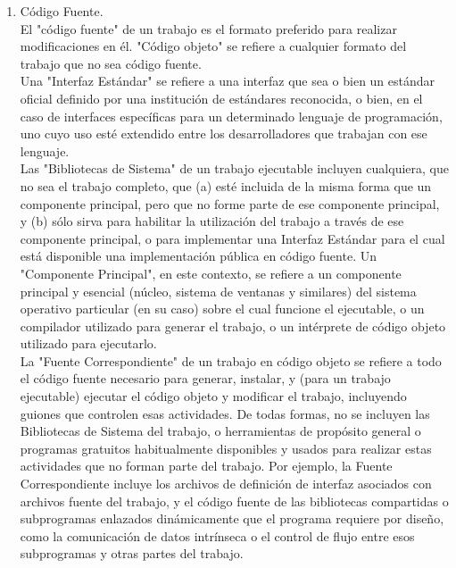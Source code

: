 \begin{enumerate}
	
	\item Código Fuente.\\
	
	El "código fuente" de un trabajo es el formato preferido para realizar modificaciones en él. "Código objeto" se refiere a cualquier formato del trabajo que no sea código fuente.\\
	
	Una "Interfaz Estándar" se refiere a una interfaz que sea o bien un estándar oficial definido por una institución de estándares reconocida, o bien, en el caso de interfaces específicas para un determinado lenguaje de programación, uno cuyo uso esté extendido entre los desarrolladores que trabajan con ese lenguaje.\\
	
	Las "Bibliotecas de Sistema" de un trabajo ejecutable incluyen cualquiera, que no sea el trabajo completo, que (a) esté incluida de la misma forma que un componente principal, pero que no forme parte de ese componente principal, y (b) sólo sirva para habilitar la utilización del trabajo a través de ese componente principal, o para implementar una Interfaz Estándar para el cual está disponible una implementación pública en código fuente. Un "Componente Principal", en este contexto, se refiere a un componente principal y esencial (núcleo, sistema de ventanas y similares) del sistema operativo particular (en su caso) sobre el cual funcione el ejecutable, o un compilador utilizado para generar el trabajo, o un intérprete de código objeto utilizado para ejecutarlo.\\
	
	La "Fuente Correspondiente" de un trabajo en código objeto se refiere a todo el código fuente necesario para generar, instalar, y (para un trabajo ejecutable) ejecutar el código objeto y modificar el trabajo, incluyendo guiones que controlen esas actividades. De todas formas, no se incluyen las Bibliotecas de Sistema del trabajo, o herramientas de propósito general o programas gratuitos habitualmente disponibles y usados para realizar estas actividades que no forman parte del trabajo. Por ejemplo, la Fuente Correspondiente incluye los archivos de definición de interfaz asociados con archivos fuente del trabajo, y el código fuente de las bibliotecas compartidas o subprogramas enlazados dinámicamente que el programa requiere por diseño, como la comunicación de datos intrínseca o el control de  flujo entre esos subprogramas y otras partes del trabajo.\\
	

\end{enumerate}
